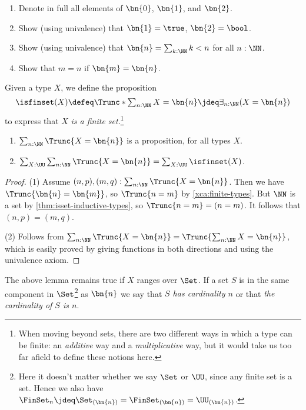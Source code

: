 \begin{xca}\label{xca:finite-types}
\hspace{1in}
  \begin{enumerate}
  \item Denote in full all elements of $\bn{0}$, $\bn{1} $, and $\bn{2}$.
  \item Show (using univalence) that $\bn{1} =\true$, $\bn{2} =\bool$.
  \item Show (using univalence) that $\bn{n} = \sum_{k:\NN} k<n$ for all $n:\NN$.
  \item Show that $m=n$ if $\bn{m}=\bn{n}$.\qedhere
  \end{enumerate}
\end{xca}
\begin{definition}\label{def:is-finite}
  Given a type $X$, we define the proposition
  \[
    \textstyle
    \isfinset(X) \defeq \Trunc*{\sum_{n:\NN}X=\bn{n}}
    \jdeq \exists_{n:\NN}(X=\bn{n})
  \]
  to express that $X$ \emph{is a finite set}.\footnote{%
    When moving beyond sets, there are two different ways
    in which a type can be finite: an \emph{additive}
    way and a \emph{multiplicative} way, but
    it would take us too far afield to define these notions
    here.} %
\end{definition}
\begin{lemma}\label{lem:maxonefinitetype}
\leavevmode
\begin{enumerate}
  \item $\sum_{n:\NN}\Trunc{X=\bn{n}}$ is a proposition, for all types $X$.
  \item
$\sum_{X:\UU}\sum_{n:\NN}\Trunc{X=\bn{n}} =\sum_{X:\UU}\isfinset(X)$.
  \end{enumerate}
\end{lemma}
\begin{proof}

(1) Assume $(n,p),(m,q): \sum_{n:\NN}\Trunc{X=\bn{n}}$.
Then we have $\Trunc{\bn{n}=\bn{m}}$, so $\Trunc{n=m}$
by \cref{xca:finite-types}. But $\NN$ is a set by \cref{thm:isset-inductive-types},
so $\Trunc{n=m}=(n=m)$. It follows that $(n,p)=(m,q)$.

(2) Follows from $\sum_{n:\NN}\Trunc{X=\bn{n}} =\Trunc{\sum_{n:\NN}X=\bn{n}}$,
which is easily proved by giving functions in both directions and using the univalence axiom.
\end{proof}

The above lemma remains true if $X$ ranges over $\Set$.
If a set $S$ is in the same component in $\Set$\footnote{%
  Here it doesn't matter whether we say $\Set$ or $\UU$,
  since any finite set is a set.
  Hence we also have $\FinSet_n
  \jdeq \Set_{(\bn{n})} = \FinSet_{(\bn{n})}
  = \UU_{(\bn{n})}$.}
as $\bn{n}$ we say that \emph{$S$ has cardinality $n$} or that \emph{the cardinality of $S$ is $n$}.

